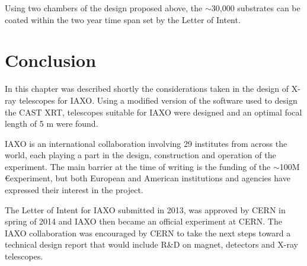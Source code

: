 Using two chambers of the design proposed above, the $\sim$30,000 substrates can be coated within the two year time span set by the Letter of Intent.

\section{Conclusion}
In this chapter was described shortly the considerations taken in the design of X-ray telescopes for IAXO. Using a modified version of the software used to design the CAST XRT, telescopes suitable for IAXO were designed and an optimal focal length of 5 m were found.

IAXO is an international collaboration involving 29 institutes from across the world, each playing a part in the design, construction and operation of the experiment. The main barrier at the time of writing is the funding of the $\sim$100M \euro experiment, but both European and American institutions and agencies have expressed their interest in the project.

The Letter of Intent for IAXO submitted in 2013, was approved by CERN in spring of 2014 and IAXO then became an official experiment at CERN. The IAXO collaboration was encouraged by CERN to take the next steps toward a technical design report that would include R\&D on magnet, detectors and X-ray telescopes.
